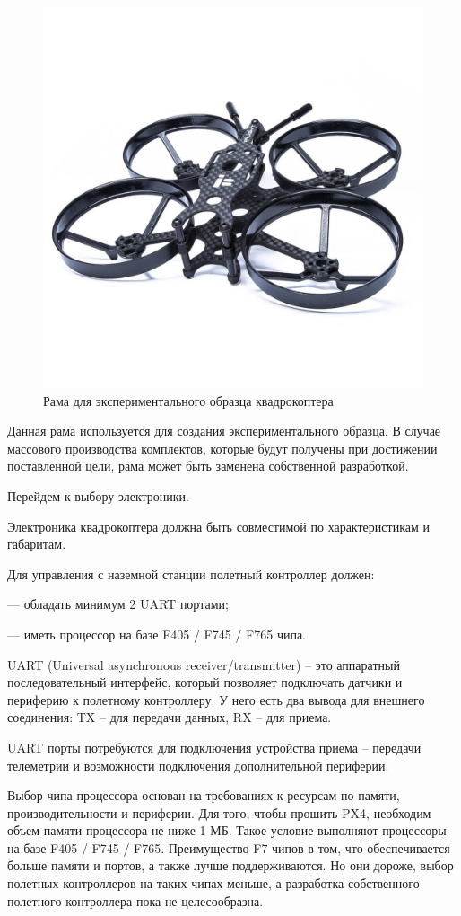 \begin{figure}[H]
	\centering
	\includegraphics[width=0.5\linewidth]{pics/frame}
	\caption{Рама для экспериментального образца квадрокоптера
	}
	\label{fig:frame}
\end{figure}

Данная рама используется для создания экспериментального образца. В случае массового производства комплектов, которые будут получены при достижении поставленной цели, рама может быть заменена собственной разработкой.

Перейдем к выбору электроники.

Электроника квадрокоптера должна быть совместимой по характеристикам и габаритам. 

Для управления с наземной станции полетный контроллер должен:

--- обладать минимум 2 UART портами;

--- иметь процессор на базе F405 / F745 / F765 чипа.

UART (Universal asynchronous receiver/transmitter) -- это аппаратный последовательный интерфейс, который позволяет подключать датчики и периферию к полетному контроллеру. У него есть два вывода для внешнего соединения: TX -- для передачи данных, RX -- для приема.

UART порты потребуются для подключения устройства приема -- передачи телеметрии и возможности подключения дополнительной периферии.

Выбор чипа процессора основан на требованиях к ресурсам по памяти, производительности и периферии. Для того, чтобы прошить PX4, необходим объем памяти процессора не ниже 1 МБ. Такое условие выполняют процессоры на базе F405 / F745 / F765. Преимущество F7 чипов в том, что обеспечивается больше памяти и портов, а также лучше поддерживаются. Но они дороже, выбор полетных контроллеров на таких чипах меньше, а разработка собственного полетного контроллера пока не целесообразна.

